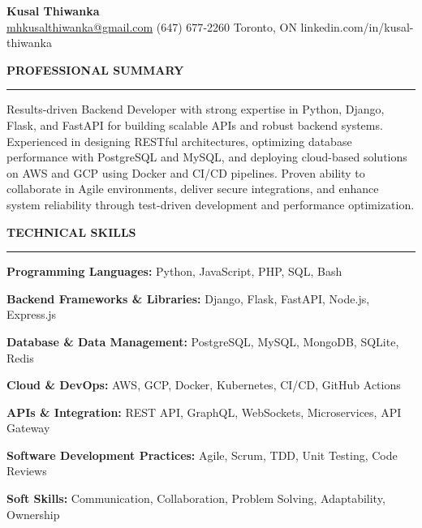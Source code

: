 \documentclass[10pt,letterpaper]{article}
\begin{document}
\begin{center}
{\LARGE\textbf{Kusal Thiwanka}}\\[3pt]
\href{mailto:mhkusalthiwanka@gmail.com}{mhkusalthiwanka@gmail.com}\hspace{2em}%
(647) 677{-}2260\hspace{2em}%
Toronto, ON\hspace{2em}
linkedin.com/in/kusal-thiwanka
\end{center}

\vspace{6pt}

\textbf{PROFESSIONAL SUMMARY}\\[-8pt]
\noindent\rule{\textwidth}{1pt}

\vspace{-2pt}

Results-driven Backend Developer with strong expertise in Python, Django, Flask, and FastAPI for building scalable APIs and robust backend systems. Experienced in designing RESTful architectures, optimizing database performance with PostgreSQL and MySQL, and deploying cloud-based solutions on AWS and GCP using Docker and CI/CD pipelines. Proven ability to collaborate in Agile environments, deliver secure integrations, and enhance system reliability through test-driven development and performance optimization.

\vspace{8pt}

\textbf{TECHNICAL SKILLS}\\[-8pt]
\noindent\rule{\textwidth}{1pt}

\vspace{-2pt}

\textbf{Programming Languages:} Python, JavaScript, PHP, SQL, Bash

\textbf{Backend Frameworks \& Libraries:} Django, Flask, FastAPI, Node.js, Express.js

\textbf{Database \& Data Management:} PostgreSQL, MySQL, MongoDB, SQLite, Redis

\textbf{Cloud \& DevOps:} AWS, GCP, Docker, Kubernetes, CI/CD, GitHub Actions

\textbf{APIs \& Integration:} REST API, GraphQL, WebSockets, Microservices, API Gateway

\textbf{Software Development Practices:} Agile, Scrum, TDD, Unit Testing, Code Reviews

\textbf{Soft Skills:} Communication, Collaboration, Problem Solving, Adaptability, Ownership
\end{document}
